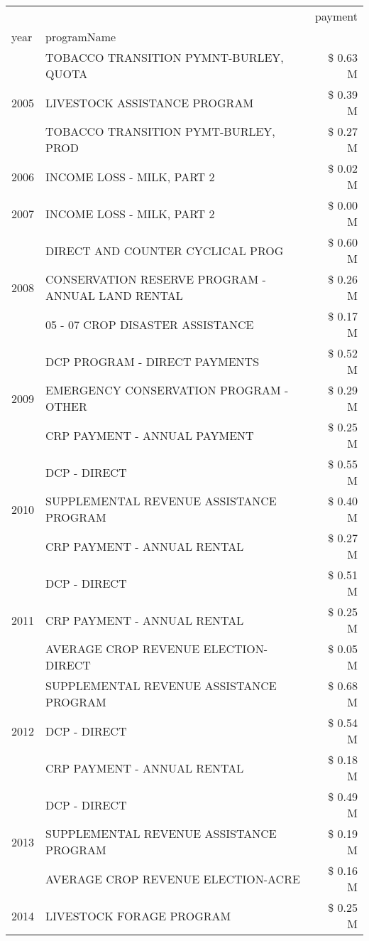 \begin{tabular}{llr}
\toprule
 &  & payment \\
year & programName &  \\
\midrule
\multirow[t]{3}{*}{2005} & TOBACCO TRANSITION PYMNT-BURLEY, QUOTA & \$ 0.63 M \\
 & LIVESTOCK ASSISTANCE PROGRAM & \$ 0.39 M \\
 & TOBACCO TRANSITION PYMT-BURLEY, PROD & \$ 0.27 M \\
\cline{1-3}
2006 & INCOME LOSS - MILK, PART 2 & \$ 0.02 M \\
\cline{1-3}
2007 & INCOME LOSS - MILK, PART 2 & \$ 0.00 M \\
\cline{1-3}
\multirow[t]{3}{*}{2008} & DIRECT AND COUNTER CYCLICAL PROG & \$ 0.60 M \\
 & CONSERVATION RESERVE PROGRAM - ANNUAL LAND RENTAL & \$ 0.26 M \\
 & 05 - 07 CROP DISASTER ASSISTANCE & \$ 0.17 M \\
\cline{1-3}
\multirow[t]{3}{*}{2009} & DCP PROGRAM - DIRECT PAYMENTS & \$ 0.52 M \\
 & EMERGENCY CONSERVATION PROGRAM - OTHER & \$ 0.29 M \\
 & CRP PAYMENT - ANNUAL PAYMENT & \$ 0.25 M \\
\cline{1-3}
\multirow[t]{3}{*}{2010} & DCP - DIRECT & \$ 0.55 M \\
 & SUPPLEMENTAL REVENUE ASSISTANCE PROGRAM & \$ 0.40 M \\
 & CRP PAYMENT - ANNUAL RENTAL & \$ 0.27 M \\
\cline{1-3}
\multirow[t]{3}{*}{2011} & DCP - DIRECT & \$ 0.51 M \\
 & CRP PAYMENT - ANNUAL RENTAL & \$ 0.25 M \\
 & AVERAGE CROP REVENUE ELECTION-DIRECT & \$ 0.05 M \\
\cline{1-3}
\multirow[t]{3}{*}{2012} & SUPPLEMENTAL REVENUE ASSISTANCE PROGRAM & \$ 0.68 M \\
 & DCP - DIRECT & \$ 0.54 M \\
 & CRP PAYMENT - ANNUAL RENTAL & \$ 0.18 M \\
\cline{1-3}
\multirow[t]{3}{*}{2013} & DCP - DIRECT & \$ 0.49 M \\
 & SUPPLEMENTAL REVENUE ASSISTANCE PROGRAM & \$ 0.19 M \\
 & AVERAGE CROP REVENUE ELECTION-ACRE & \$ 0.16 M \\
\cline{1-3}
\multirow[t]{3}{*}{2014} & LIVESTOCK FORAGE PROGRAM & \$ 0.25 M \\

\end{tabular}
